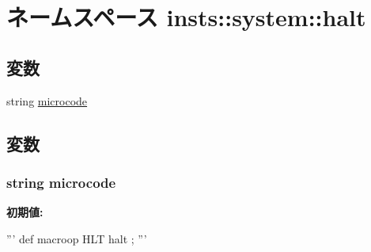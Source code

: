\hypertarget{namespaceinsts_1_1system_1_1halt}{
\section{ネームスペース insts::system::halt}
\label{namespaceinsts_1_1system_1_1halt}
}
\subsection*{変数}
\begin{DoxyCompactItemize}
\item 
string \hyperlink{namespaceinsts_1_1system_1_1halt_a770f11a173e99389a8802f0107ed8f52}{microcode}
\end{DoxyCompactItemize}


\subsection{変数}
\hypertarget{namespaceinsts_1_1system_1_1halt_a770f11a173e99389a8802f0107ed8f52}{
\subsubsection[{microcode}]{\setlength{\rightskip}{0pt plus 5cm}string {\bf microcode}}}
\label{namespaceinsts_1_1system_1_1halt_a770f11a173e99389a8802f0107ed8f52}
{\bfseries 初期値:}
\begin{DoxyCode}
'''
def macroop HLT {
    halt
};
'''
\end{DoxyCode}
